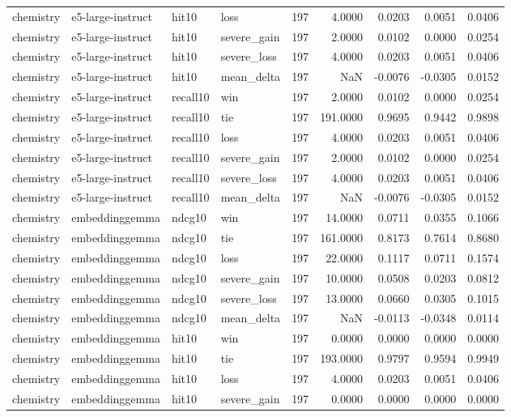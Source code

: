\begin{tabular}{llllrrrrr}
chemistry & e5-large-instruct & hit10 & loss & 197 & 4.0000 & 0.0203 & 0.0051 & 0.0406 \\
chemistry & e5-large-instruct & hit10 & severe\_gain & 197 & 2.0000 & 0.0102 & 0.0000 & 0.0254 \\
chemistry & e5-large-instruct & hit10 & severe\_loss & 197 & 4.0000 & 0.0203 & 0.0051 & 0.0406 \\
chemistry & e5-large-instruct & hit10 & mean\_delta & 197 & NaN & -0.0076 & -0.0305 & 0.0152 \\
chemistry & e5-large-instruct & recall10 & win & 197 & 2.0000 & 0.0102 & 0.0000 & 0.0254 \\
chemistry & e5-large-instruct & recall10 & tie & 197 & 191.0000 & 0.9695 & 0.9442 & 0.9898 \\
chemistry & e5-large-instruct & recall10 & loss & 197 & 4.0000 & 0.0203 & 0.0051 & 0.0406 \\
chemistry & e5-large-instruct & recall10 & severe\_gain & 197 & 2.0000 & 0.0102 & 0.0000 & 0.0254 \\
chemistry & e5-large-instruct & recall10 & severe\_loss & 197 & 4.0000 & 0.0203 & 0.0051 & 0.0406 \\
chemistry & e5-large-instruct & recall10 & mean\_delta & 197 & NaN & -0.0076 & -0.0305 & 0.0152 \\
chemistry & embeddinggemma & ndcg10 & win & 197 & 14.0000 & 0.0711 & 0.0355 & 0.1066 \\
chemistry & embeddinggemma & ndcg10 & tie & 197 & 161.0000 & 0.8173 & 0.7614 & 0.8680 \\
chemistry & embeddinggemma & ndcg10 & loss & 197 & 22.0000 & 0.1117 & 0.0711 & 0.1574 \\
chemistry & embeddinggemma & ndcg10 & severe\_gain & 197 & 10.0000 & 0.0508 & 0.0203 & 0.0812 \\
chemistry & embeddinggemma & ndcg10 & severe\_loss & 197 & 13.0000 & 0.0660 & 0.0305 & 0.1015 \\
chemistry & embeddinggemma & ndcg10 & mean\_delta & 197 & NaN & -0.0113 & -0.0348 & 0.0114 \\
chemistry & embeddinggemma & hit10 & win & 197 & 0.0000 & 0.0000 & 0.0000 & 0.0000 \\
chemistry & embeddinggemma & hit10 & tie & 197 & 193.0000 & 0.9797 & 0.9594 & 0.9949 \\
chemistry & embeddinggemma & hit10 & loss & 197 & 4.0000 & 0.0203 & 0.0051 & 0.0406 \\
chemistry & embeddinggemma & hit10 & severe\_gain & 197 & 0.0000 & 0.0000 & 0.0000 & 0.0000 \\

\end{tabular}
